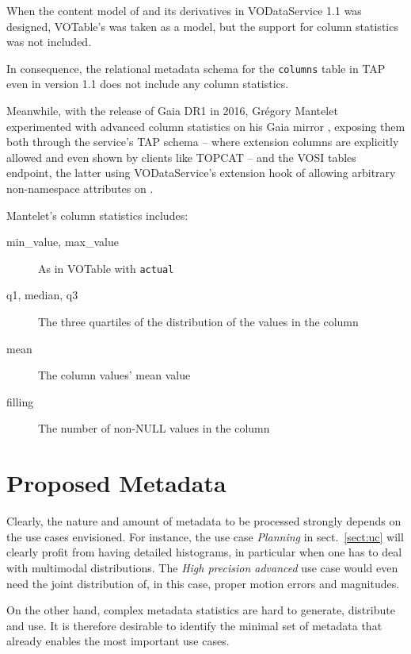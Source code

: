 \documentclass[11pt,a4paper]{ivoa}
\begin{document}
When the content model of  and its derivatives in
VODataService 1.1 \citep{2010ivoa.spec.1202P} was designed, VOTable's
 was taken as a model, but the support for column statistics
was not included.

In consequence, the relational metadata schema for the
\verb|columns| table in TAP \citep{2019ivoa.spec.0927D} even in
version 1.1 does not include any column statistics.

Meanwhile, with the release of Gaia DR1 in 2016, Gr\'egory Mantelet
experimented with advanced column statistics on his Gaia mirror
\citep{data:arigaia}, exposing them both through the service's TAP
schema -- where extension columns are explicitly allowed and even shown
by clients like TOPCAT \citep{2005ASPC..347...29T} -- and the VOSI tables
endpoint, the latter using VODataService's extension hook of allowing
arbitrary non-namespace attributes on .

Mantelet's column statistics includes:

\begin{description}
\item[min\_value, max\_value] As in VOTable with  \verb|actual|
\item[q1, median, q3] The three quartiles of the distribution of the
values in the column
\item[mean] The column values' mean value
\item[filling] The number of non-NULL values in the column
\end{description}


\section{Proposed Metadata}
\label{sect:metadata}

Clearly, the nature and amount of metadata to be processed strongly
depends on the use cases envisioned.  For instance, the use case
\emph{Planning} in sect.~\ref{sect:uc} will clearly profit from having
detailed histograms, in particular when one has to deal with multimodal
distributions.  The \emph{High precision advanced} use case would even
need the joint distribution of, in this case, proper motion errors and
magnitudes.

On the other hand, complex metadata statistics are hard to generate,
distribute and use.  It is therefore desirable to identify the
minimal set of metadata that already enables the most important use
cases.
\end{document}
